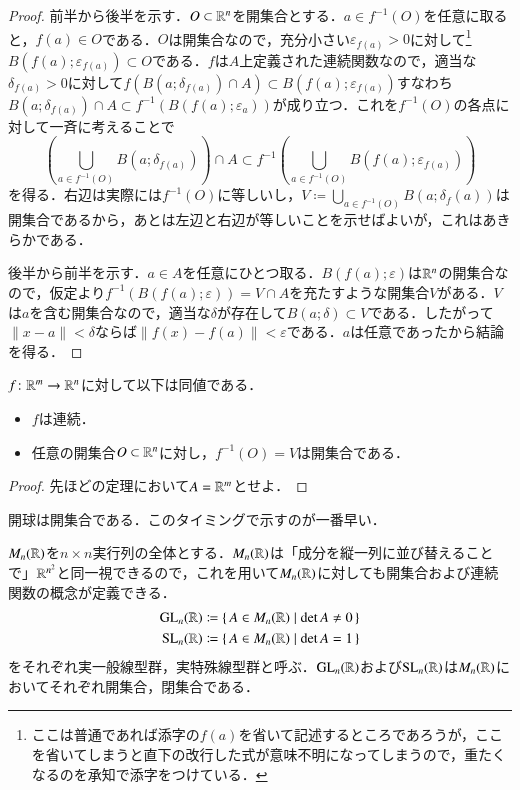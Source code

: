 \begin{proof}
前半から後半を示す．$O \subset \mathbb{R}^n$を開集合とする．$a \in f^{-1}(O)$を任意に取ると，$f(a) \in O$である．$O$は開集合なので，充分小さい$\varepsilon_{f(a)} > 0$に対して\footnote{ここは普通であれば添字の$f(a)$を省いて記述するところであろうが，ここを省いてしまうと直下の改行した式が意味不明になってしまうので，重たくなるのを承知で添字をつけている．}$B(f(a);\varepsilon_{f(a)}) \subset O$である．$f$は$A$上定義された連続関数なので，適当な$\delta_{f(a)} >0$に対して$f(B(a; \delta_{f(a)}) \cap A) \subset B(f(a); \varepsilon_{f(a)})$すなわち$B(a; \delta_{f(a)}) \cap A \subset f^{-1}(B(f(a); \varepsilon_a))$が成り立つ．これを$f^{-1}(O)$の各点に対して一斉に考えることで
\begin{equation}
\left( \bigcup_{a \in f^{-1}(O)} B(a; \delta_{f(a)}) \right) \cap A \subset f^{-1}\left(\bigcup_{a \in f^{-1}(O)} B(f(a); \varepsilon_{f(a)}) \right)
\end{equation}を得る．右辺は実際には$f^{-1}(O)$に等しいし，$V \coloneqq\bigcup_{a \in f^{-1}(O)} B(a; \delta_f(a))$は開集合であるから，あとは左辺と右辺が等しいことを示せばよいが，これはあきらかである．

後半から前半を示す．$a \in A$を任意にひとつ取る．$B(f(a); \varepsilon)$は$\mathbb{R}^n$の開集合なので，仮定より$f^{-1}(B(f(a); \varepsilon)) = V \cap A$を充たすような開集合$V$がある．$V$は$a$を含む開集合なので，適当な$\delta$が存在して$B(a; \delta) \subset V$である．したがって$\|x -a\| < \delta$ならば$\|f(x)- f(a)\| < \varepsilon$である．$a$は任意であったから結論を得る．
\end{proof}

\begin{cor}
$f \colon \mathbb{R}^m \to \mathbb{R}^n$に対して以下は同値である．
\begin{itemize}
\item $f$は連続．
\item 任意の開集合$O \subset \mathbb{R}^n$に対し，$f^{-1}(O) = V$は開集合である．
\end{itemize}
\end{cor}

\begin{proof}
先ほどの定理において$A=\mathbb{R}^m$とせよ．
\end{proof}

\begin{que}
開球は開集合である．このタイミングで示すのが一番早い．
\end{que}

\begin{que}[*]
$M_n(\mathbb{R})$を$n \times n$実行列の全体とする．$M_n(\mathbb{R})$は「成分を縦一列に並び替えることで」$\mathbb{R}^{n^2}$と同一視できるので，これを用いて$M_n(\mathbb{R})$に対しても開集合および連続関数の概念が定義できる．
\begin{align}
{\rm GL}_n(\mathbb{R}) &\coloneqq \set{A \in M_n(\mathbb{R}) | \det A \neq 0}\\
{\rm SL}_n(\mathbb{R}) &\coloneqq \set{A \in M_n(\mathbb{R}) | \det A = 1}
\end{align}をそれぞれ実一般線型群，実特殊線型群と呼ぶ．${\rm GL}_n(\mathbb{R})$および${\rm SL}_n(\mathbb{R})$は$M_n(\mathbb{R})$においてそれぞれ開集合，閉集合である．
\end{que}


